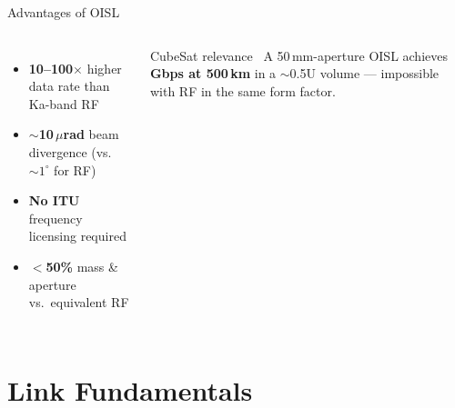 \documentclass{KAIST-slide}
\newcommand{\ai}{\item[\textcolor{islcteal}{\ding{228}}]}      %
\newcommand{\hi}[1]{\textcolor{islcorange}{\textbf{#1}}}       %
\newcommand{\key}[1]{\textcolor{islcblue}{\textbf{#1}}}        %
\begin{document}
\begin{frame}{Advantages of OISL}
    \begin{columns}[T]
        \begin{itemize}
            \ai \hi{10--100$\times$} higher data rate than Ka-band RF
            \ai \hi{$\sim$10\,$\mu$rad} beam divergence (vs.\ $\sim1^\circ$ for RF)
            \ai \hi{No ITU} frequency licensing required
            \ai \hi{$<$50\%} mass \& aperture vs.\ equivalent RF
        \end{itemize}
        \begin{block}{CubeSat relevance~\cite{toyoshima2021trends,cahoy2020click}}
        A 50\,mm-aperture OISL achieves \key{Gbps at 500\,km} in a $\sim$0.5U volume --- impossible with RF in the same form factor.
        \end{block}
    \end{columns}
\end{frame}

\section{Link Fundamentals}
\end{document}
